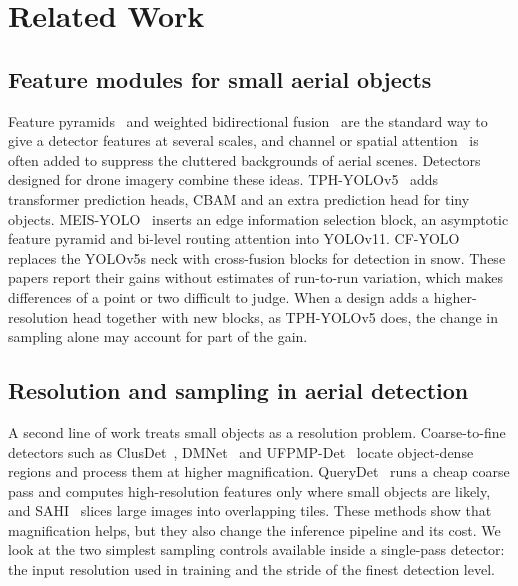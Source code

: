 \documentclass[preprint,12pt]{elsarticle}
\begin{document}
\section{Related Work}
\label{sec:related}

\subsection{Feature modules for small aerial objects}

Feature pyramids~\cite{fpn,panet} and weighted bidirectional
fusion~\cite{efficientdet} are the standard way to give a detector features at
several scales, and channel or spatial attention~\cite{senet,cbam,ecanet} is
often added to suppress the cluttered backgrounds of aerial scenes. Detectors
designed for drone imagery combine these ideas. TPH-YOLOv5~\cite{tph-yolo} adds
transformer prediction heads, CBAM and an extra prediction head for tiny objects.
MEIS-YOLO~\cite{meis-yolo} inserts an edge information selection block, an
asymptotic feature pyramid and bi-level routing attention into YOLOv11.
CF-YOLO~\cite{cf-yolo} replaces the YOLOv5s neck with cross-fusion blocks for
detection in snow. These papers report their gains without estimates of
run-to-run variation, which makes differences of a point or two difficult to
judge. When a design adds a higher-resolution head together with new blocks, as
TPH-YOLOv5 does, the change in sampling alone may account for part of the gain.

\subsection{Resolution and sampling in aerial detection}

A second line of work treats small objects as a resolution problem. Coarse-to-fine
detectors such as ClusDet~\cite{clusdet}, DMNet~\cite{li2020dmnet} and
UFPMP-Det~\cite{huang2022ufpmp} locate object-dense regions and process them at
higher magnification. QueryDet~\cite{yang2022querydet} runs a cheap coarse pass
and computes high-resolution features only where small objects are likely, and
SAHI~\cite{akyon2022sahi} slices large images into overlapping tiles. These
methods show that magnification helps, but they also change the inference pipeline
and its cost. We look at the two simplest sampling controls available inside a
single-pass detector: the input resolution used in training and the stride of the
finest detection level.
\end{document}
